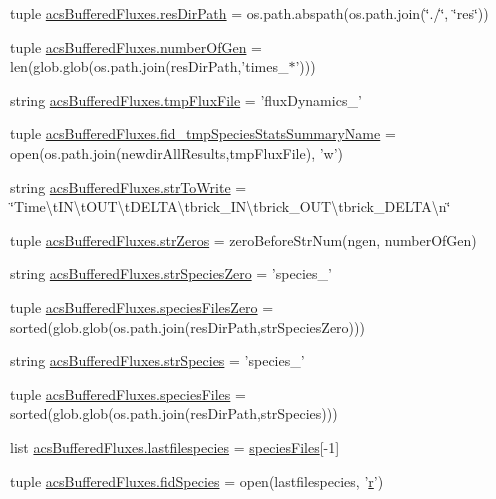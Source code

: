 \begin{DoxyCompactItemize}
\item 
tuple \hyperlink{a00126_abc625ab1aeed5741a02bbaccfbee5c06}{acs\+Buffered\+Fluxes.\+res\+Dir\+Path} = os.\+path.\+abspath(os.\+path.\+join(\char`\"{}./\char`\"{}, \char`\"{}res\char`\"{}))
\item 
tuple \hyperlink{a00126_acd3059fa3a61438f739193dc80f23b80}{acs\+Buffered\+Fluxes.\+number\+Of\+Gen} = len(glob.\+glob(os.\+path.\+join(res\+Dir\+Path,'times\+\_\+$\ast$')))
\item 
string \hyperlink{a00126_a170166907641e54151f8d83d51420165}{acs\+Buffered\+Fluxes.\+tmp\+Flux\+File} = 'flux\+Dynamics\+\_\+'
\item 
tuple \hyperlink{a00126_a88cbb3d14405daf2c6df49cf769fd0d2}{acs\+Buffered\+Fluxes.\+fid\+\_\+tmp\+Species\+Stats\+Summary\+Name} = open(os.\+path.\+join(newdir\+All\+Results,tmp\+Flux\+File), 'w')
\item 
string \hyperlink{a00126_af89a0c5bd58d5bd9787225c1c9aeab8b}{acs\+Buffered\+Fluxes.\+str\+To\+Write} = \char`\"{}Time\textbackslash{}t\+I\+N\textbackslash{}t\+O\+U\+T\textbackslash{}t\+D\+E\+L\+T\+A\textbackslash{}tbrick\+\_\+\+I\+N\textbackslash{}tbrick\+\_\+\+O\+U\+T\textbackslash{}tbrick\+\_\+\+D\+E\+L\+T\+A\textbackslash{}n\char`\"{}
\item 
tuple \hyperlink{a00126_abfa8fbc48a0ad5b6dff6914d6052b2b6}{acs\+Buffered\+Fluxes.\+str\+Zeros} = zero\+Before\+Str\+Num(ngen, number\+Of\+Gen)
\item 
string \hyperlink{a00126_a658920d97b6df23e672e290d362033b4}{acs\+Buffered\+Fluxes.\+str\+Species\+Zero} = 'species\+\_\+'
\item 
tuple \hyperlink{a00126_a8c18127c32adcc1a3403749a047270e5}{acs\+Buffered\+Fluxes.\+species\+Files\+Zero} = sorted(glob.\+glob(os.\+path.\+join(res\+Dir\+Path,str\+Species\+Zero)))
\item 
string \hyperlink{a00126_a36518d8de93502466a6d4b2e62eb7734}{acs\+Buffered\+Fluxes.\+str\+Species} = 'species\+\_\+'
\item 
tuple \hyperlink{a00126_ae41c9dafcdeb581e70eeb889d16c6551}{acs\+Buffered\+Fluxes.\+species\+Files} = sorted(glob.\+glob(os.\+path.\+join(res\+Dir\+Path,str\+Species)))
\item 
list \hyperlink{a00126_a887b4124ed717643d4e79b6d9597109f}{acs\+Buffered\+Fluxes.\+lastfilespecies} = \hyperlink{a00028_af5703745c2c2a6af7f62da460994d9c2}{species\+Files}\mbox{[}-\/1\mbox{]}
\item 
tuple \hyperlink{a00126_ad38778cd180f00344e8a8d68511f56fd}{acs\+Buffered\+Fluxes.\+fid\+Species} = open(lastfilespecies, '\hyperlink{a00031_ac862e7284527eb913b1351c8bfb8e079}{r}')

\end{DoxyCompactItemize}
